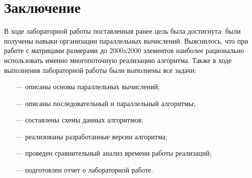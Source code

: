 \chapter*{Заключение}

В ходе лабораторной работы поставленная ранее цель была достигнута: были получены навыки организации параллельных вычислений. Выяснилось, что при работе с матрицами размерами до 2000x2000 элементов наиболее рационально использовать именно многопоточную реализацию алгоритма. Также в ходе выполнения лабораторной работы были выполнены все задачи: 
\begin{itemize}
	\item[---] описаны основы параллельных вычислений;
	\item[---] описаны последовательный и параллельный алгоритмы;
	\item[---] составлены схемы данных алгоритмов;
    \item[---] реализованы разработанные версии алгоритма;
	\item[---] проведен сравнительный анализ времени работы реализаций;
    \item[---] подготовлен отчет о лабораторной работе.
\end{itemize}


